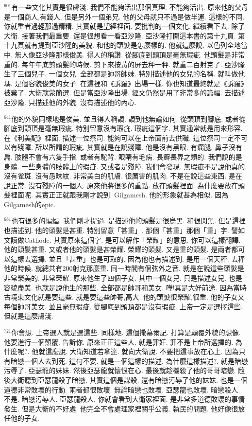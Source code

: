 \documentclass{book}
\begin{document}
$^{601}$有一些文化其實是很膚淺.
我們不能夠活出那個真理.
不能夠活出.
原來他的父母是一個商人,有錢人.
但是另外一個弟兄.
他的父母就只不過是做半運.
這樣的不同.
你就重者過輕那過精精.
其實就是聖經裡面.
要批判的一個文化.
繼續看下去.
除了大衛.
接著我們最重要.
還是很想看一看亞沙隆.
亞沙隆打開這本書的第十九頁.
第十九頁就有提到亞沙隆的美貌.
和他的頭髮是怎麼樣的.
他就這麼說.
以色列全地當中.
無人像亞沙隆那樣俊美.
得人的稱讚.
從腳底到頭頂是毫無瑕疵.
他頭髮是非常重的.
每年年底剪頭髮的時候.
剪下來按黃的屏去秤一秤.
就重二百射克了.
亞沙隆生了三個兒子.
一個女兒.
全部都是帥哥帥妹.
特別描述他的女兒的名稱.
就叫做他瑪.
是個容貌俊美的女子.
在這裡和《訴羅》出場一樣.
你也知道最終就是《訴羅》被棄了.
大衛就蒙簡選.
但是當亞沙隆出場.
經文仍然是用了非常多的篇幅.
去描述亞沙隆.
只描述他的外貌.
沒有描述他的內心.

$^{641}$他的外貌同樣地是俊美.
並且得人稱讚.
讚到他無論如何.
從頭頂到腳底.
或者從腳底到頭頂是毫無瑕疵.
特別留意沒有瑕疵.
瑕疵這個字.
其實通常就是用來形容.
在《利美記》裡面.
描述一位祭司.
能夠可以在上帝面前去供職.
這位祭司一定不可以有殘障.
所以所謂的瑕疵.
其實就是在說殘障.
他是沒有黑眼.
有瘸腿.
鼻子沒有扁.
肢體不會有六隻手指.
或者有駝背.
眼睛有毛病.
長癬長界之類的.
我們說的是身體.
一些身體的肢體上的瑕疵.
又或者是殘障.
我們會發現.
無瑕疵不是說他真的.
沒有雀斑.
沒有愚昧紋.
非常美白的肌膚.
很厲害的肌肉.
不是在說這些東西.
是在說正常.
沒有殘障的一個人.
原來他將很多的重點.
放在頭髮裡面.
為什麼要放在頭髮裡面呢.
其實正正就跟我剛才說到.
Gilgamesh.
他的形象就甚為相似.
因為Gilgamesh的epic.

$^{681}$也有很多的蝙蝠.
我們剛才提過.
是描述他的頭髮是很烏黑.
和很閃黑.
但是這裡也描述到.
他的頭髮是甚重.
特別留意「甚重」.
那個「甚重」那個「重」字.
譬如文讀做Cathode.
其實原來這個字.
是可以解作「榮耀」的意思.
你可以這樣翻譯.
他的頭髮甚重.
又或者他的頭髮是甚榮耀.
榮耀的頭髮.
又是重的頭髮.
是兩者都可以這樣去選擇.
並且「甚重」也是可取的.
因為他也有描述到.
是用一個天秤.
去秤他的時候.
就總共有200射克那麼重.
同一時間有個弦外之音.
就是在說這些頭髮是非常榮美的.
非常榮耀.
原來他生了四個子女.
其中一個女兒.
只是描述女兒.
也是容貌盡美.
也就是說他生的那些.
全部都是帥哥和美女.
嘩!真是大好前途.
因為當時古境東文化就是要這些.
就是要這些帥哥,高大.
他的頭髮很榮耀,很重.
他的子女又每個帥哥美女.
並且毫無瑕疵.
從腳底到頭頂都是沒有瑕疵.
上帝一定是選擇這些.
但就是這麼膚淺.

$^{721}$你會想.
上帝選人就是選這些.
同樣地.
這個撒慕爾記.
打算是顛覆外貌的想像.
他要進行一個顛覆.
告訴你.
原來正正這些人.
就是罪奸.
罪不是上帝所選擇的.
為什麼呢?.
他就這麼說.
大衛知道若拿達.
就向大衛說.
不要把這事放在心上.
因為只有暗戀一個人去到死.
這句不要.
就是一個這樣的描述.
為什麼這樣描述?.
就是暗戀污辱了.
亞瑟龍的妹妹.
然後亞瑟龍就懷恨在心.
最後就趁機殺了他的哥哥暗戀.
隨後大衛聽到亞瑟龍殺了暗戀.
其實這個是謀殺.
還有暗戀污辱了他的妹妹.
也是一個道德非常敗壞的行動.
兩者都很敗壞.
無論暗戀也敗壞.
亞瑟龍也敗壞.
暗戀殺人.
不是.
暗戀污辱人.
亞瑟龍殺人.
你就會看到大衛家裡面.
是非常多道德敗壞的事情發生.
但是大衛的不好處.
他完全不會處理家裡關乎公義.
執民的問題.
他好像很放任他的子女.
\end{document}
